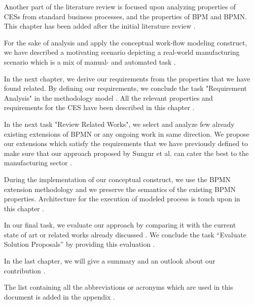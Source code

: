 Another part of the literature review is focused upon analyzing properties of \acs{CES}s from standard business processes, and the properties of \acs{BPM} and \acs{BPMN}. This chapter has been added after the initial literature review . 

For the sake of analysis and apply the conceptual work-flow modeling construct, we have described a motivating scenario depicting a real-world manufacturing scenario which is a mix of manual- and automated task .

In the next chapter, we derive our requirements from the properties that we have found related. By defining our requirements, we conclude the task "Requirement Analysis" in the methodology model . All the relevant properties and requirements for the \acs{CES} have been described in this chapter .

In the next task "Review Related Works", we select and analyze few already existing extensions of \acs{BPMN} or any ongoing work in same direction. We propose our extensions which satisfy the requirements that we have previously defined to make sure that our approach proposed by Sungur et al. \cite{TIMURCIRP} can cater the best to the manufacturing sector . 

During the implementation of our conceptual construct, we use the \acs{BPMN} extension methodology and we preserve the semantics of the existing \acs{BPMN} properties. Architecture for the execution of modeled process is touch upon in this chapter .

In our final task, we evaluate our approach by comparing it with the current state of art or related works already discussed . We conclude the task “Evaluate Solution Proposals” by providing this evaluation . 

In the last chapter, we will give a summary and an outlook about our contribution . 

The list containing all the abbreviations or acronyms which are used in this document is added in the appendix .